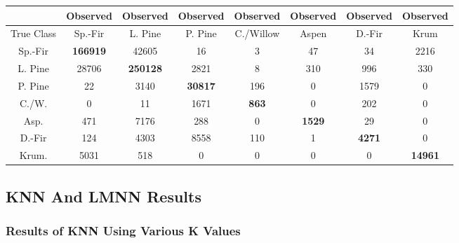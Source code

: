\documentclass[11pt]{article}
\begin{document}
\begin{center}
\begin{tabular}{|c | c| c| c| c| c |c| c|}
\hline
 & Observed& Observed& Observed& Observed& Observed& Observed& Observed \\ \hline
True Class & Sp.-Fir & L. Pine & P. Pine & C./Willow & Aspen & D.-Fir & Krum \\ \hline
Sp.-Fir & \textbf{166919} & 42605 & 16 & 3 & 47 & 34 & 2216 \\ \hline
L. Pine & 28706 & \textbf{250128} & 2821 & 8 & 310 & 996 & 330 \\ \hline
P. Pine & 22 & 3140 &  \textbf{30817} & 196 & 0 & 1579 & 0 \\ \hline
C./W. & 0 & 11 & 1671 &  \textbf{863} & 0 & 202 & 0 \\ \hline
Asp. & 471 & 7176 & 288 & 0 &  \textbf{1529} & 29 & 0 \\ \hline
D.-Fir & 124 & 4303 & 8558 & 110 & 1 &  \textbf{4271} & 0 \\ \hline
Krum. & 5031 & 518 & 0 & 0 & 0 & 0 &  \textbf{14961} \\ \hline
\end{tabular}
\end{center}

\subsection{KNN And LMNN Results}
    \subsubsection{Results of KNN Using Various K Values}
\end{document}
